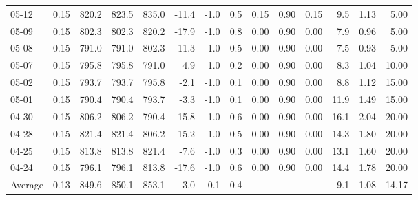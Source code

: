 \begin{threeparttable}
{\begin{tabular}{lrrrrrrrrrrrrr}
  05-12 &     0.15 & 820.2 & 823.5 & 835.0 &      -11.4 &                     -1.0 &                 0.5 &       0.15 &      0.90 &           0.15 &              9.5 &            1.13 &                   5.00 \\
  05-09 &     0.15 & 802.3 & 802.3 & 820.2 &      -17.9 &                     -1.0 &                 0.8 &       0.00 &      0.90 &           0.00 &              7.9 &            0.96 &                   5.00 \\
  05-08 &     0.15 & 791.0 & 791.0 & 802.3 &      -11.3 &                     -1.0 &                 0.5 &       0.00 &      0.90 &           0.00 &              7.5 &            0.93 &                   5.00 \\
  05-07 &     0.15 & 795.8 & 795.8 & 791.0 &        4.9 &                      1.0 &                 0.2 &       0.00 &      0.90 &           0.00 &              8.3 &            1.04 &                  10.00 \\
  05-02 &     0.15 & 793.7 & 793.7 & 795.8 &       -2.1 &                     -1.0 &                 0.1 &       0.00 &      0.90 &           0.00 &              8.8 &            1.12 &                  15.00 \\
  05-01 &     0.15 & 790.4 & 790.4 & 793.7 &       -3.3 &                     -1.0 &                 0.1 &       0.00 &      0.90 &           0.00 &             11.9 &            1.49 &                  15.00 \\
  04-30 &     0.15 & 806.2 & 806.2 & 790.4 &       15.8 &                      1.0 &                 0.6 &       0.00 &      0.90 &           0.00 &             16.1 &            2.04 &                  20.00 \\
  04-28 &     0.15 & 821.4 & 821.4 & 806.2 &       15.2 &                      1.0 &                 0.5 &       0.00 &      0.90 &           0.00 &             14.3 &            1.80 &                  20.00 \\
  04-25 &     0.15 & 813.8 & 813.8 & 821.4 &       -7.6 &                     -1.0 &                 0.3 &       0.00 &      0.90 &           0.00 &             13.1 &            1.60 &                  20.00 \\
  04-24 &     0.15 & 796.1 & 796.1 & 813.8 &      -17.6 &                     -1.0 &                 0.6 &       0.00 &      0.90 &           0.00 &             14.4 &            1.78 &                  20.00 \\
Average &     0.13 & 849.6 & 850.1 & 853.1 &       -3.0 &                     -0.1 &                 0.4 &         -- &        -- &             -- &              9.1 &            1.08 &                  14.17 \\

\end{tabular}}
\end{threeparttable}
